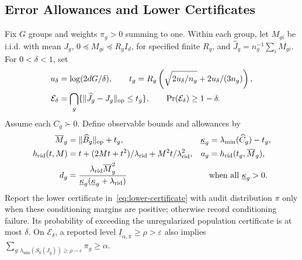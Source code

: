 \subsection{Error Allowances and Lower Certificates}
\label{app:lower-audit}
\begin{appendixproposition}
\label{prop:appB-lower-certificate}
Fix $G$ groups and weights $\pi_g>0$ summing to one. Within each group, let $M_{gi}$ be i.i.d. with mean $J_g$, $0\preceq M_{gi}\preceq R_gI_d$, for specified finite $R_g$, and $\widehat J_g=n_g^{-1}\sum_iM_{gi}$. For $0<\delta<1$, set
\begin{equation}
\begin{aligned}
u_\delta&=\log(2dG/\delta),\qquad
 t_g=R_g\left(\sqrt{2u_\delta/n_g}+2u_\delta/(3n_g)\right),\\
\mathcal E_\delta&=\bigcap_g\{\lVert\widehat J_g-J_g\rVert_{\mathrm{op}}\le t_g\},
\qquad \Pr(\mathcal E_\delta)\ge1-\delta.
\end{aligned}
\label{eq:appB-matrix-event}
\end{equation}
Assume each $C_g\succ0$. Define observable bounds and allowances by
\begin{equation}
\begin{aligned}
\overline M_g&=\lVert\widehat B_g\rVert_{\mathrm{op}}+t_g,
&\underline\kappa_g&=\lambda_{\min}(\widehat C_g)-t_g,\\
h_{\mathrm{rid}}(t,M)&=t+(2Mt+t^2)/\lambda_{\mathrm{rid}}+M^2t/\lambda_{\mathrm{rid}}^2,
&a_g&=h_{\mathrm{rid}}(t_g,\overline M_g),\\
d_g&=\frac{\lambda_{\mathrm{rid}}\overline M_g^2}
{\underline\kappa_g(\underline\kappa_g+\lambda_{\mathrm{rid}})}
&&\text{when all }\underline\kappa_g>0.
\end{aligned}
\label{eq:appB-allowances}
\end{equation}
Report the lower certificate in~\eqref{eq:lower-certificate} with audit distribution $\pi$ only when these conditioning margins are positive; otherwise record conditioning failure. Its probability of exceeding the unregularized population certificate is at most $\delta$. On $\mathcal E_\delta$, a reported level $\underline I_{\alpha,\pi}\ge\rho>\varepsilon$ also implies $\sum_{g:\lambda_{\min}(S_0(J_g))\ge\rho-\varepsilon}\pi_g\ge\alpha$.
\end{appendixproposition}
